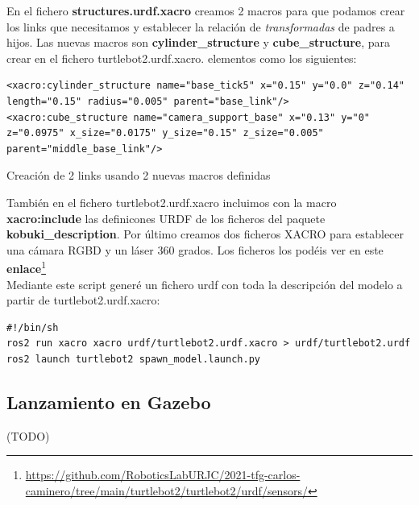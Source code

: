 En el fichero \textbf{structures.urdf.xacro} creamos 2 macros para que podamos crear los links que necesitamos y establecer la relación de \textit{transformadas} de padres a hijos. Las nuevas macros son \textbf{cylinder\_structure} y \textbf{cube\_structure}, para crear en el fichero turtlebot2.urdf.xacro. elementos como los siguientes:
\begin{code}[H]
\begin{lstlisting}
<xacro:cylinder_structure name="base_tick5" x="0.15" y="0.0" z="0.14" length="0.15" radius="0.005" parent="base_link"/>
<xacro:cube_structure name="camera_support_base" x="0.13" y="0" z="0.0975" x_size="0.0175" y_size="0.15" z_size="0.005" parent="middle_base_link"/>
\end{lstlisting}
\caption{Creación de 2 links usando 2 nuevas macros definidas}
\label{fig:creacion_link_macro}
\end{code}

También en el fichero turtlebot2.urdf.xacro incluimos con la macro \textbf{xacro:include} las definicones URDF de los ficheros del paquete \textbf{kobuki\_description}. Por último creamos dos ficheros XACRO para establecer una cámara RGBD y un láser 360 grados. Los ficheros los podéis ver en este \textbf{enlace}\footnote{\url{https://github.com/RoboticsLabURJC/2021-tfg-carlos-caminero/tree/main/turtlebot2/turtlebot2/urdf/sensors/}}\\

Mediante este script generé un fichero urdf con toda la descripción del modelo a partir de turtlebot2.urdf.xacro:
\begin{lstlisting}
#!/bin/sh
ros2 run xacro xacro urdf/turtlebot2.urdf.xacro > urdf/turtlebot2.urdf
ros2 launch turtlebot2 spawn_model.launch.py
\end{lstlisting}

\subsection{Lanzamiento en Gazebo}
\label{sec:turtlebot2_gazebo}

(TODO)
